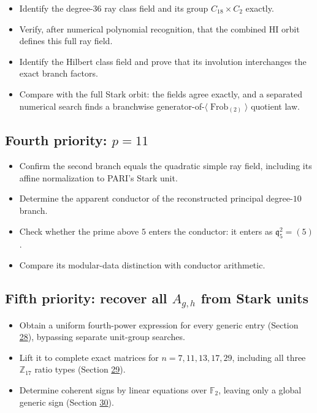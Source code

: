 \documentclass[11pt,reqno]{amsart}
\theoremstyle{plain}
\begin{document}
\begin{itemize}
\item[$\boxtimes$] Identify the degree-\(36\) ray class field and its group \(C_{18}\times C_2\) exactly.
\item[$\boxtimes$] Verify, after numerical polynomial recognition, that the combined HI orbit defines this full ray field.
\item[$\boxtimes$] Identify the Hilbert class field and prove that its involution interchanges the exact branch factors.
\item[$\boxtimes$] Compare with the full Stark orbit: the fields agree exactly, and a separated numerical search finds a branchwise generator-of-\(\langle\operatorname{Frob}_{(2)}\rangle\) quotient law.
\end{itemize}

\subsection{\texorpdfstring{Fourth priority: \(p=11\)}{Fourth priority: p=11}}\label{sec:18.4}

\begin{itemize}
\item[$\boxtimes$] Confirm the second branch equals the quadratic simple ray field, including its affine normalization to PARI's Stark unit.
\item[$\boxtimes$] Determine the apparent conductor of the reconstructed principal degree-\(10\) branch.
\item[$\boxtimes$] Check whether the prime above \(5\) enters the conductor: it enters as \(\mathfrak q_5^2=(5)\).
\item[$\square$] Compare its modular-data distinction with conductor arithmetic.
\end{itemize}

\subsection{\texorpdfstring{Fifth priority: recover all \(A_{g,h}\) from Stark units}{Fifth priority: recover all Ag,h from Stark units}}\label{sec:18.5}

\begin{itemize}
\item[$\boxtimes$] Obtain a uniform fourth-power expression for every generic entry (Section \hyperref[sec:28]{28}), bypassing separate unit-group searches.
\item[$\boxtimes$] Lift it to complete exact matrices for \(n=7,11,13,17,29\), including all three \(\mathbb Z_{17}\) ratio types (Section \hyperref[sec:29]{29}).
\item[$\boxtimes$] Determine coherent signs by linear equations over \(\mathbb F_2\), leaving only a global generic sign (Section \hyperref[sec:30]{30}).
\end{itemize}
\end{document}
